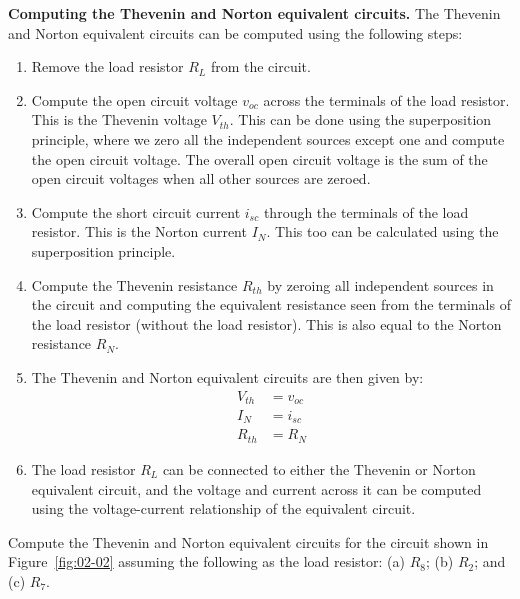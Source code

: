 \noindent\textbf{Computing the Thevenin and Norton equivalent circuits.} The Thevenin and Norton equivalent circuits can be computed using the following steps:
\begin{enumerate}
    \item Remove the load resistor $R_L$ from the circuit.
    \item Compute the open circuit voltage $v_{oc}$ across the terminals of the load resistor. This is the Thevenin voltage $V_{th}$. This can be done using the superposition principle, where we zero all the independent sources except one and compute the open circuit voltage. The overall open circuit voltage is the sum of the open circuit voltages when all other sources are zeroed.
    \item Compute the short circuit current $i_{sc}$ through the terminals of the load resistor. This is the Norton current $I_{N}$. This too can be calculated using the superposition principle.
    \item Compute the Thevenin resistance $R_{th}$ by zeroing all independent sources in the circuit and computing the equivalent resistance seen from the terminals of the load resistor (without the load resistor). This is also equal to the Norton resistance $R_{N}$.
    \item The Thevenin and Norton equivalent circuits are then given by:
    \begin{equation}
        \begin{split}
            V_{th} &= v_{oc}\\
            I_{N} &= i_{sc}\\
            R_{th} &= R_{N}
        \end{split}
        \label{eq:02-23}
    \end{equation}
    \item The load resistor $R_L$ can be connected to either the Thevenin or Norton equivalent circuit, and the voltage and current across it can be computed using the voltage-current relationship of the equivalent circuit.
\end{enumerate}

\begin{boxedstuff}
    \begin{problem}
        Compute the Thevenin and Norton equivalent circuits for the circuit shown in Figure~\ref{fig:02-02} assuming the following as the load resistor: (a) $R_8$; (b) $R_2$; and (c) $R_7$.
    \end{problem}
\end{boxedstuff}

